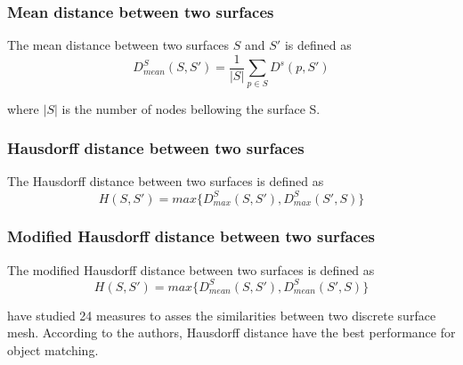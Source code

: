 \subsubsection*{Mean distance between two surfaces}
The mean distance between two surfaces $S$ and $S'$ is defined as 
\begin{equation}
D^S_{mean}(S, S') = \frac{1}{\vert S \vert} \sum_{p \in S}  D^s(p, S') 
\end{equation}

where $\vert S \vert$ is the number of nodes bellowing the surface S.
\subsubsection*{Hausdorff distance between two surfaces}
The Hausdorff distance \citep{huttenlocher_comparing_1993} between two surfaces is defined as 
\begin{equation}
H(S,S') = max \lbrace D^S_{max}(S,S'), D^S_{max}(S',S)\rbrace
\end{equation}
\subsubsection*{Modified Hausdorff distance between two surfaces}
The modified Hausdorff distance between two surfaces is defined as 
\begin{equation}
H(S,S') = max \lbrace D^S_{mean}(S,S'), D^S_{mean}(S',S)\rbrace
\end{equation}

\cite{dubuisson_modified_1994} have studied 24 measures to asses the similarities between two discrete surface mesh. According to the authors, Hausdorff distance have the best performance for object matching. 